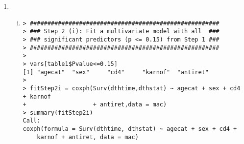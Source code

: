 \begin{enumerate}[(a)]
\begin{enumerate}[Step 1:]
\begin{spacing}{1.2}
\end{spacing}
Note that the \verb|paste| function here is used to concatenate the strings. Now we're going to get the results for each variable of interest using a \verb|for| loop. We save each model in an object called \verb|fit|. Then we can easily extract all the information we need from this object (see \verb|?coxph.object|, and type \verb|str(fit)| and \verb|str(summary(fit))| to see what's included in \verb|fit|).
\begin{spacing}{1.2}
\begin{footnotesize}
\begin{verbatim}
> # Constructing the Table1
> table1 = data.frame(Estimate = rep(NA,8),SE = NA,Pvalue = NA)
> rownames(table1) = vars
> 
> library(survival)
> for (i in 1:(length(vars)-2))
+ {
+   # Fit univariate models
+   fit = coxph(formula(paste(time.expr,vars[i])),data = mac)
+   
+   # Save results
+   res = summary(fit)
+   
+   table1[i,] = c(coef(fit),sqrt(vcov(fit)),res$logtest[3])
+ }
> 
> # We need both rif and clari to evaluate the treatment effect!
> fit = coxph(Surv(dthtime,dthstat) ~ rif + clari,data = mac)
> res = summary(fit)
> 
> table1[7:8,"Estimate"] = coef(fit)
> table1[7:8,"SE"] = sqrt(diag(vcov(fit)))
> table1[7:8,"Pvalue"] = res$coef[,5]
> table1$HR = exp(table1$Estimate)
> round(table1,3)
        Estimate    SE Pvalue    HR
agecat     0.367 0.093  0.000 1.443
sex        0.236 0.145  0.115 1.266
cd4       -0.012 0.002  0.000 0.988
karnof    -0.045 0.005  0.000 0.956
ivdrug     0.102 0.122  0.408 1.108
antiret   -0.214 0.099  0.033 0.808
rif       -0.087 0.107  0.417 0.916
clari     -0.115 0.108  0.285 0.891
> 
> # Wald test for the combined effect of treatment
> res$waldtest
     test        df    pvalue 
1.2600000 2.0000000 0.5337685 
\end{verbatim}
\end{footnotesize}
\end{spacing}
When evaluating the significance of treatment we must include both the \emph{rif}
and \emph{clari} effects in the model. It seems that the effect of treatment on time to death is not significant.
\newpage
\item \begin{enumerate}[(i)]
\item \begin{spacing}{1.2}
\begin{footnotesize}
\begin{verbatim}
> ######################################################
> ### Step 2 (i): Fit a multivariate model with all  ###
> ### significant predictors (p <= 0.15) from Step 1 ###
> ######################################################
> 
> vars[table1$Pvalue<=0.15]
[1] "agecat"  "sex"     "cd4"     "karnof"  "antiret"
> 
> fitStep2i = coxph(Surv(dthtime,dthstat) ~ agecat + sex + cd4 + karnof 
+                   + antiret,data = mac)
> summary(fitStep2i)
Call:
coxph(formula = Surv(dthtime, dthstat) ~ agecat + sex + cd4 + 
    karnof + antiret, data = mac)


\end{verbatim}
\end{footnotesize}
\end{spacing}
\end{enumerate}
\end{enumerate}
\end{enumerate}
